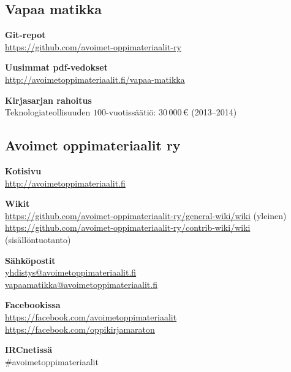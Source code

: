 \subsection*{Vapaa matikka}

\textbf{Git-repot} \\
\url{https://github.com/avoimet-oppimateriaalit-ry}

\textbf{Uusimmat pdf-vedokset} \\
\url{http://avoimetoppimateriaalit.fi/vapaa-matikka}

\textbf{Kirjasarjan rahoitus} \\
Teknologiateollisuuden $100$-vuotissäätiö: $30\,000$\,\euro \; (2013--2014)

\subsection*{Avoimet oppimateriaalit ry}

\textbf{Kotisivu} \\
\url{http://avoimetoppimateriaalit.fi}

\textbf{Wikit} \\
\url{https://github.com/avoimet-oppimateriaalit-ry/general-wiki/wiki} (yleinen) \\
\url{https://github.com/avoimet-oppimateriaalit-ry/contrib-wiki/wiki} (sisällöntuotanto)

\textbf{Sähköpostit} \\
\href{mailto:yhdistys@avoimetoppimateriaalit.fi}{yhdistys@avoimetoppimateriaalit.fi} \\
\href{mailto:vapaamatikka@avoimetoppimateriaalit.fi}{vapaamatikka@avoimetoppimateriaalit.fi}

\textbf{Facebookissa} \\
\url{https://facebook.com/avoimetoppimateriaalit} \\
\url{https://facebook.com/oppikirjamaraton}

\textbf{IRCnetissä} \\
\#avoimetoppimateriaalit
